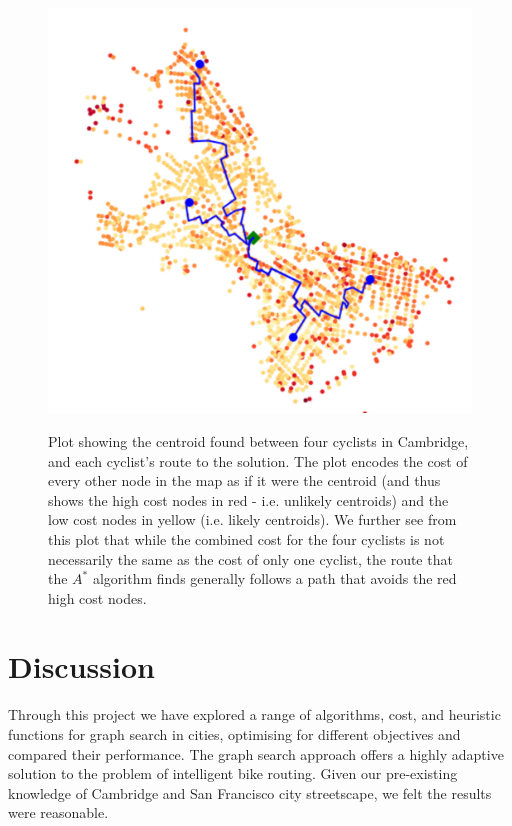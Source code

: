 \documentclass[11pt]{article}
\begin{document}
\begin{figure}[H]
\caption{Plot showing the centroid found between four cyclists in Cambridge, and each cyclist's route to the solution. The plot encodes the cost of every other node in the map as if it were the centroid (and thus shows the high cost nodes in red - i.e. unlikely centroids) and the low cost nodes in yellow (i.e. likely centroids). We further see from this plot that while the combined cost for the four cyclists is not necessarily the same as the cost of only one cyclist, the route that the $A^{*}$ algorithm finds generally follows a path that avoids the red high cost nodes.}
\includegraphics[width=1\textwidth]{../images/overall_plot.png}
\label{overall_plot}
\end{figure}

\section{Discussion}

Through this project we have explored a range of algorithms, cost, and heuristic functions for graph search in cities, optimising for different objectives and compared their performance.  The graph search approach offers a highly adaptive solution to the problem of intelligent bike routing. Given our pre-existing knowledge of Cambridge and San Francisco city streetscape, we felt the results were reasonable. 
\end{document}
